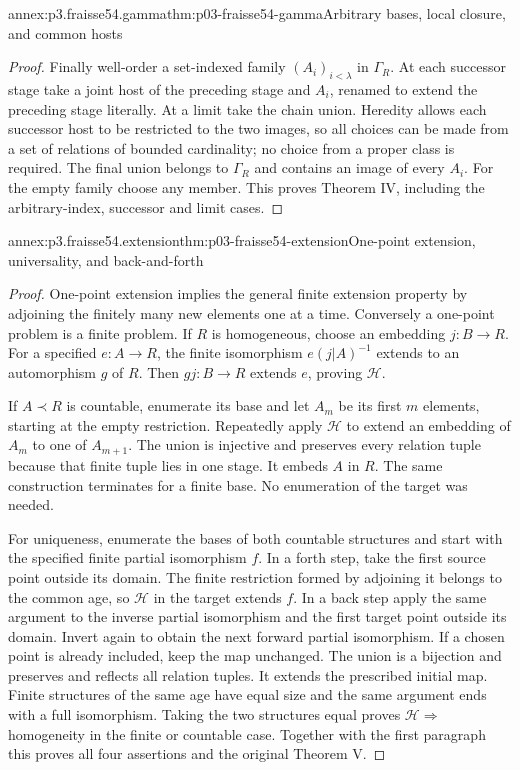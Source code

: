 \begin{annexitem}{annex:p3.fraisse54.gamma}{thm:p03-fraisse54-gamma}{Arbitrary bases, local closure, and common hosts}
\begin{proof}
Finally well-order a set-indexed family \((A_i)_{i<\lambda}\) in
\(\Gamma_R\). At each successor stage take a joint host of the preceding
stage and \(A_i\), renamed to extend the preceding stage literally.
At a limit take the chain union. Heredity allows each successor host to
be restricted to the two images, so all choices can be made from a set of
relations of bounded cardinality; no choice from a proper class is required.
The final union belongs to \(\Gamma_R\) and contains an image of every
\(A_i\). For the empty family choose any member. This proves Theorem IV,
including the arbitrary-index, successor and limit cases.
\end{proof}
\end{annexitem}

\begin{annexitem}{annex:p3.fraisse54.extension}{thm:p03-fraisse54-extension}{One-point extension, universality, and back-and-forth}
\begin{proof}
One-point extension implies the general finite extension property by adjoining
the finitely many new elements one at a time. Conversely a one-point problem
is a finite problem. If \(R\) is homogeneous, choose an embedding
\(j:B\to R\). For a specified \(e:A\to R\), the finite isomorphism
\(e(j|A)^{-1}\) extends to an automorphism \(g\) of \(R\). Then
\(gj:B\to R\) extends \(e\), proving \(\mathcal H\).

If \(A\prec R\) is countable, enumerate its base and let \(A_m\)
be its first \(m\) elements, starting at the empty restriction. Repeatedly
apply \(\mathcal H\) to extend an embedding of \(A_m\) to one of
\(A_{m+1}\). The union is injective and preserves every relation tuple
because that finite tuple lies in one stage. It embeds \(A\) in \(R\).
The same construction terminates for a finite base. No enumeration of the
target was needed.

For uniqueness, enumerate the bases of both countable structures and start
with the specified finite partial isomorphism \(f\). In a forth step,
take the first source point outside its domain. The finite restriction
formed by adjoining it belongs to the common age, so \(\mathcal H\)
in the target extends \(f\). In a back step apply the same argument to
the inverse partial isomorphism and the first target point outside its
domain. Invert again to obtain the next forward partial isomorphism.
If a chosen point is already included, keep the map unchanged. The union
is a bijection and preserves and reflects all relation tuples. It extends
the prescribed initial map. Finite structures of the same age have equal
size and the same argument ends with a full isomorphism. Taking the two
structures equal proves \(\mathcal H\Rightarrow\) homogeneity in the
finite or countable case. Together with the first paragraph this proves
all four assertions and the original Theorem V.
\end{proof}
\end{annexitem}

